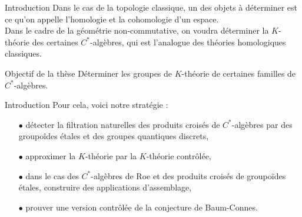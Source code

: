 \begin{frame}{Introduction}
Dans le cas de la topologie classique, un des objets à déterminer est ce qu'on appelle l'homologie et la cohomologie d'un espace.\\
\vspace{0.3 cm}
Dans le cadre de la géométrie non-commutative, on voudra déterminer la $K$-théorie des certaines $C^*$-algèbres, qui est l'analogue des théories homologiques classiques. 
\vspace{0.3 cm}
\begin{block}{Objectif de la thèse}
Déterminer les groupes de $K$-théorie de certaines familles de $C^*$-algèbres.
\end{block}
\end{frame}

\begin{frame}{Introduction}
Pour cela, voici notre stratégie :\\
\vspace{0.3 cm}
\begin{itemize}
\item[$\bullet$] détecter la filtration naturelles des produits croisés de $C^*$-algèbres par des groupoîdes étales et des groupes quantiques discrets,
\vspace{0.3 cm}
\item[$\bullet$] approximer la $K$-théorie par la $K$-théorie contrôlée,
\vspace{0.3 cm}
\item[$\bullet$] dans le cas des $C^*$-algèbres de Roe et des produits croisés de groupoïdes étales, construire des applications d'assemblage,
\vspace{0.3 cm}
\item[$\bullet$] prouver une version contrôlée de la conjecture de Baum-Connes.
\end{itemize}
\end{frame}
